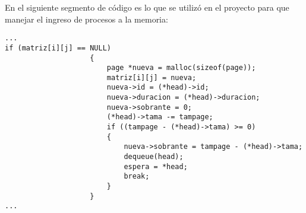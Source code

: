 \documentclass[10pt,a4paper]{article}
\begin{document}
En el siguiente segmento de código es lo que se utilizó en el proyecto para que manejar el ingreso de procesos a la memoria: 
\begin{verbatim}
...
if (matriz[i][j] == NULL)
                    {
                        page *nueva = malloc(sizeof(page));
                        matriz[i][j] = nueva;
                        nueva->id = (*head)->id;
                        nueva->duracion = (*head)->duracion;
                        nueva->sobrante = 0;
                        (*head)->tama -= tampage;
                        if ((tampage - (*head)->tama) >= 0)
                        {
                            nueva->sobrante = tampage - (*head)->tama;
                            dequeue(head);
                            espera = *head;
                            break;
                        }
                    }
...
\end{verbatim} 
\hfill
\hfill
\break
\end{document}
